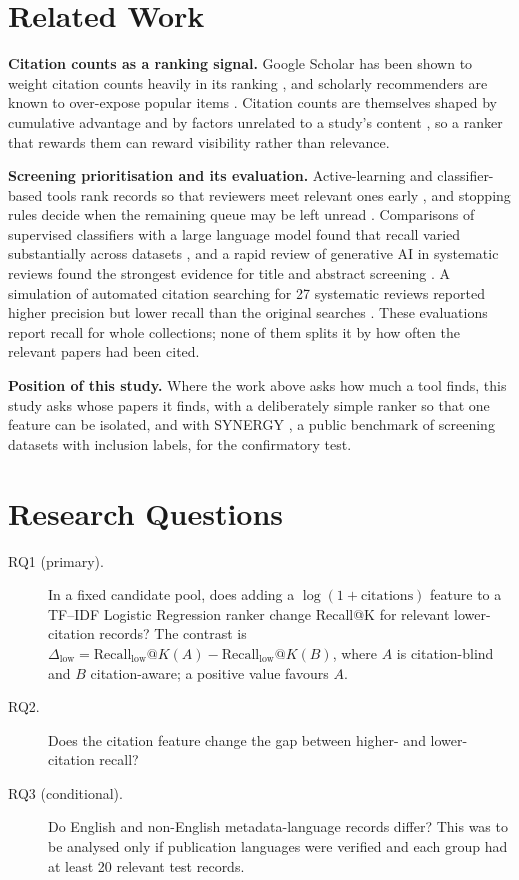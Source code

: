 \documentclass[acmsmall,screen,nonacm]{acmart}
\begin{document}
\section{Related Work}
\label{sec:related}

\textbf{Citation counts as a ranking signal.} Google Scholar has been shown to weight citation counts
heavily in its ranking \cite{beel2009citation}, and scholarly recommenders are known to over-expose
popular items \cite{farber2023biases,klimashevskaia2024survey}. Citation counts are themselves shaped by
cumulative advantage \cite{merton1968matthew} and by factors unrelated to a study's content
\cite{duyx2017scientific,lund2025predictors}, so a ranker that rewards them can reward visibility rather
than relevance.

\textbf{Screening prioritisation and its evaluation.} Active-learning and classifier-based tools rank
records so that reviewers meet relevant ones early \cite{przybyla2018prioritising,vandeschoot2021asreview},
and stopping rules decide when the remaining queue may be left unread \cite{callaghan2020stopping}.
Comparisons of supervised classifiers with a large language model found that recall varied substantially
across datasets \cite{aigner2026comparing}, and a rapid review of generative AI in systematic reviews found
the strongest evidence for title and abstract screening \cite{fleurence2026use}. A simulation of automated
citation searching for 27 systematic reviews reported higher precision but lower recall than the original
searches \cite{rajit2025automated}. These evaluations report recall for whole collections; none of them
splits it by how often the relevant papers had been cited.

\textbf{Position of this study.} Where the work above asks how much a tool finds, this study asks whose
papers it finds, with a deliberately simple ranker so that one feature can be isolated, and with SYNERGY
\cite{debruin2023synergy}, a public benchmark of screening datasets with inclusion labels, for the
confirmatory test.

\section{Research Questions}
\label{sec:rq}

\begin{description}
\item[RQ1 (primary).] In a fixed candidate pool, does adding a $\log(1+\text{citations})$ feature to a
TF--IDF Logistic Regression ranker change Recall@K for relevant lower-citation records? The contrast is
$\Delta_{\text{low}} = \text{Recall}_{\text{low}}@K(A) - \text{Recall}_{\text{low}}@K(B)$, where $A$ is
citation-blind and $B$ citation-aware; a positive value favours $A$.
\item[RQ2.] Does the citation feature change the gap between higher- and lower-citation recall?
\item[RQ3 (conditional).] Do English and non-English metadata-language records differ? This was to be
analysed only if publication languages were verified and each group had at least 20 relevant test
records.
\end{description}
\end{document}
